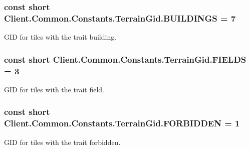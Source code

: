\subsubsection[{B\+U\+I\+L\+D\+I\+N\+G\+S}]{\setlength{\rightskip}{0pt plus 5cm}const short Client.\+Common.\+Constants.\+Terrain\+Gid.\+B\+U\+I\+L\+D\+I\+N\+G\+S = 7}\label{classClient_1_1Common_1_1Constants_1_1TerrainGid_a7a7944292196dc6c9e228f56307a36a2}


G\+I\+D for tiles with the trait building. 

\hypertarget{classClient_1_1Common_1_1Constants_1_1TerrainGid_a27c5e5ab4bc50f174e9f7a8c32e8e41e}{}
\subsubsection[{F\+I\+E\+L\+D\+S}]{\setlength{\rightskip}{0pt plus 5cm}const short Client.\+Common.\+Constants.\+Terrain\+Gid.\+F\+I\+E\+L\+D\+S = 3}\label{classClient_1_1Common_1_1Constants_1_1TerrainGid_a27c5e5ab4bc50f174e9f7a8c32e8e41e}


G\+I\+D for tiles with the trait field. 

\hypertarget{classClient_1_1Common_1_1Constants_1_1TerrainGid_acd1d9abab5cb386550cbfeaad4a503ec}{}
\subsubsection[{F\+O\+R\+B\+I\+D\+D\+E\+N}]{\setlength{\rightskip}{0pt plus 5cm}const short Client.\+Common.\+Constants.\+Terrain\+Gid.\+F\+O\+R\+B\+I\+D\+D\+E\+N = 1}\label{classClient_1_1Common_1_1Constants_1_1TerrainGid_acd1d9abab5cb386550cbfeaad4a503ec}


G\+I\+D for tiles with the trait forbidden. 

\hypertarget{classClient_1_1Common_1_1Constants_1_1TerrainGid_a71d7b502bf678ca2db83d0f4a2b5a453}{}
